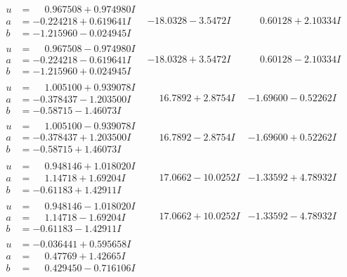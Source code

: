 \documentclass[1p]{elsarticle_modified}
\theoremstyle{definition}
\begin{document}
$$\begin{array}{c|c|c}
\begin{aligned}
u &= \phantom{-}0.967508 + 0.974980 I \\
a &= -0.224218 + 0.619641 I \\
b &= -1.215960 - 0.024945 I\end{aligned}
 & -18.0328 - 3.5472 I & \phantom{-}0.60128 + 2.10334 I \\ \hline\begin{aligned}
u &= \phantom{-}0.967508 - 0.974980 I \\
a &= -0.224218 - 0.619641 I \\
b &= -1.215960 + 0.024945 I\end{aligned}
 & -18.0328 + 3.5472 I & \phantom{-}0.60128 - 2.10334 I \\ \hline\begin{aligned}
u &= \phantom{-}1.005100 + 0.939078 I \\
a &= -0.378437 - 1.203500 I \\
b &= -0.58715 - 1.46073 I\end{aligned}
 & \phantom{-}16.7892 + 2.8754 I & -1.69600 - 0.52262 I \\ \hline\begin{aligned}
u &= \phantom{-}1.005100 - 0.939078 I \\
a &= -0.378437 + 1.203500 I \\
b &= -0.58715 + 1.46073 I\end{aligned}
 & \phantom{-}16.7892 - 2.8754 I & -1.69600 + 0.52262 I \\ \hline\begin{aligned}
u &= \phantom{-}0.948146 + 1.018020 I \\
a &= \phantom{-}1.14718 + 1.69204 I \\
b &= -0.61183 + 1.42911 I\end{aligned}
 & \phantom{-}17.0662 - 10.0252 I & -1.33592 + 4.78932 I \\ \hline\begin{aligned}
u &= \phantom{-}0.948146 - 1.018020 I \\
a &= \phantom{-}1.14718 - 1.69204 I \\
b &= -0.61183 - 1.42911 I\end{aligned}
 & \phantom{-}17.0662 + 10.0252 I & -1.33592 - 4.78932 I \\ \hline\begin{aligned}
u &= -0.036441 + 0.595658 I \\
a &= \phantom{-}0.47769 + 1.42665 I \\
b &= \phantom{-}0.429450 - 0.716106 I\end{aligned}

\end{array}$$
\end{document}
